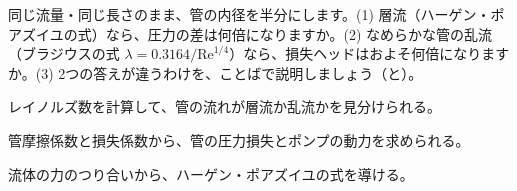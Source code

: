 \bkproblem 同じ流量・同じ長さのまま、管の内径を半分にします。(1) 層流（ハーゲン・ポアズイユの式）なら、圧力の差は何倍になりますか。(2) なめらかな管の乱流（ブラジウスの式 $\lambda=0.3164/\mathrm{Re}^{1/4}$）なら、損失ヘッドはおよそ何倍になりますか。(3) 2つの答えが違うわけを、ことばで説明しましょう（と）。

\begin{furikaeri}
\begin{checklist}
\item レイノルズ数を計算して、管の流れが層流か乱流かを見分けられる。
\item 管摩擦係数と損失係数から、管の圧力損失とポンプの動力を求められる。
\item 流体の力のつり合いから、ハーゲン・ポアズイユの式を導ける。
\end{checklist}
\end{furikaeri}
